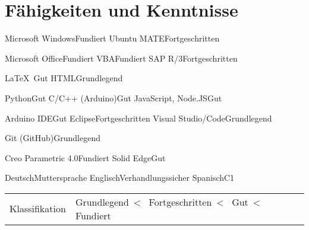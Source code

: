 
\section*{Fähigkeiten und Kenntnisse}
\medskip



\newcommand{\grundlegend}{Grundlegend}
\newcommand{\fortgeschritten}{Fortgeschritten}
\newcommand{\gut}{Gut}
\newcommand{\fundiert}{Fundiert}




	{Microsoft Windows}{\fundiert}
	{Ubuntu MATE}{\fortgeschritten}
	{}{}
	{}{}



%
	{Microsoft Office}{\fundiert}
	{VBA}{\fundiert}
	{SAP R/3}{\fortgeschritten}
	{}{}
	

%
	{\LaTeX\ }{\gut}
	{HTML}{\grundlegend}
	{}{}
	{}{}
	

%
	{Python}{\gut}	
	{C/C++ (Arduino)}{\gut}
	{JavaScript, Node.JS}{\gut}
	{}{}



	{Arduino IDE}{\gut}	
	{Eclipse}{\fortgeschritten}
	{Visual Studio/Code}{\grundlegend}
	{}{}


	{Git (GitHub)}{\grundlegend}
	{}{}
	{}{}
	{}{}
	
	
	{Creo Parametric 4.0}{\fundiert}
	{Solid Edge}{\gut}
	{}{}
	{}{}


	{Deutsch}{Muttersprache}
	{Englisch}{Verhandlungssicher}
	{Spanisch}{C1}
	{}{}
	
	
	

\noindent
\begin{tabular*}{\textwidth}{@{}R{6cm}|lll}
	\noindent
	{\small Klassifikation}	&	{\small \grundlegend\ \textless~ \fortgeschritten\ \textless~ \gut\ \textless~ \fundiert\ }
\end{tabular*}
